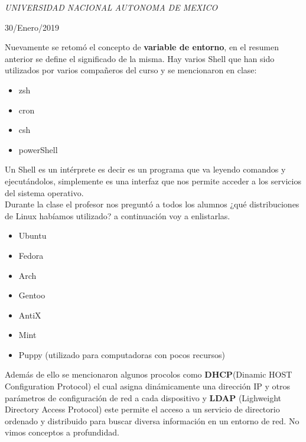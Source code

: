 \documentclass[a4paper, 11pt, oneside]{article}
\begin{document}
\begin{titlepage}
	\textit{UNIVERSIDAD NACIONAL AUTONOMA DE MEXICO} 
	
	\vfill
	
	
	
	
	\vspace{0.3\baselineskip} 
	
	30/Enero/2019 
	
	 

\end{titlepage}

Nuevamente se retomó el concepto de \textbf{variable de entorno}, en el resumen anterior se define el significado de la misma. Hay varios Shell que han sido utilizados por varios compañeros del curso y se mencionaron en clase:
\begin{itemize}
 \item zsh
 \item cron
 \item csh
 \item powerShell
\end{itemize}
Un Shell es un intérprete es decir es un programa que va leyendo comandos y ejecutándolos, simplemente es una interfaz que nos permite acceder a los servicios del sistema operativo.\\
Durante la clase el profesor nos preguntó a todos los alumnos ¿qué distribuciones de Linux habíamos utilizado? a continuación voy a enlistarlas.
\begin{itemize}
 \item Ubuntu
 \item Fedora
 \item Arch
 \item Gentoo
 \item AntiX
 \item Mint
 \item Puppy (utilizado para computadoras con pocos recursos)
\end{itemize}

Además de ello se mencionaron algunos procolos como \textbf{DHCP}(Dinamic HOST Configuration Protocol) el cual asigna dinámicamente una dirección IP y otros parámetros de configuración de red a cada dispositivo y \textbf{LDAP} (Lighweight Directory Access Protocol) este permite el acceso a un servicio de directorio ordenado y distribuido para buscar diversa información en un entorno de red. No vimos conceptos a profundidad.
\end{document}
